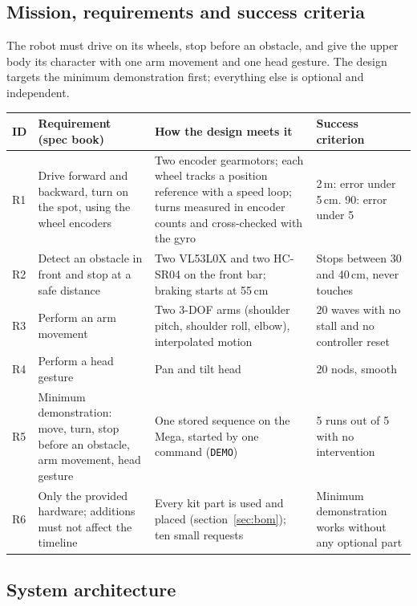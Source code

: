 \documentclass[11pt,a4paper]{article}
\renewcommand{\deg}{\textdegree}
\begin{document}
\subsection{Mission, requirements and success criteria}
The robot must drive on its wheels, stop before an obstacle, and give the upper body its character with one arm movement and one head gesture. The design targets the minimum demonstration first; everything else is optional and independent.

\begin{table}[H]\small
\begin{tabularx}{\linewidth}{@{}P{9mm}P{50mm}LP{38mm}@{}}
\toprule
\textbf{ID} & \textbf{Requirement (spec book)} & \textbf{How the design meets it} & \textbf{Success criterion}\\
\midrule
R1 & Drive forward and backward, turn on the spot, using the wheel encoders & Two encoder gearmotors; each wheel tracks a position reference with a speed loop; turns measured in encoder counts and cross-checked with the gyro & 2\,m: error under 5\,cm. 90\deg: error under 5\deg\\
R2 & Detect an obstacle in front and stop at a safe distance & Two VL53L0X and two HC-SR04 on the front bar; braking starts at 55\,cm & Stops between 30 and 40\,cm, never touches\\
R3 & Perform an arm movement & Two 3-DOF arms (shoulder pitch, shoulder roll, elbow), interpolated motion & 20 waves with no stall and no controller reset\\
R4 & Perform a head gesture & Pan and tilt head & 20 nods, smooth\\
R5 & Minimum demonstration: move, turn, stop before an obstacle, arm movement, head gesture & One stored sequence on the Mega, started by one command (\texttt{DEMO}) & 5 runs out of 5 with no intervention\\
R6 & Only the provided hardware; additions must not affect the timeline & Every kit part is used and placed (section~\ref{sec:bom}); ten small requests & Minimum demonstration works without any optional part\\
\bottomrule
\end{tabularx}
\end{table}

\subsection{System architecture}
\end{document}
